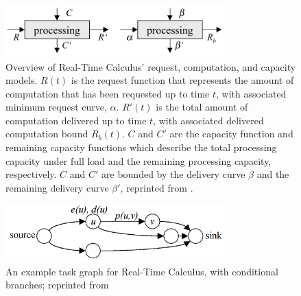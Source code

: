 \begin{figure}[htb]
  \centering
  \includegraphics[width=0.75\textwidth]{figs/rtc_overview.png}
  \caption{Overview of Real-Time Calculus' request, computation, and
    capacity models.  $R(t)$ is the request function that represents
    the amount of computation that has been requested up to time $t$,
    with associated minimum request curve, $\alpha$.  $R'(t)$ is the
    total amount of computation delivered up to time $t$, with
    associated delivered computation bound $R_b(t)$.  $C$ and $C'$ are
    the capacity function and remaining capacity functions which
    describe the total processing capacity under full load and the
    remaining processing capacity, respectively.  $C$ and $C'$ are
    bounded by the delivery curve $\beta$ and the remaining delivery
    curve $\beta'$, reprinted from \cite{Thiele00real-timecalculus}.}
  \label{fig:rtc_overview}
\end{figure}

\begin{figure}[htb]
  \centering
  \includegraphics[width=0.75\textwidth]{figs/task_graph.png}
  \caption{An example task graph for Real-Time Calculus, with
    conditional branches; reprinted from
    \cite{Thiele00real-timecalculus}}
  \label{fig:task_graph}
\end{figure}

